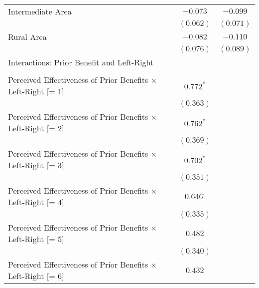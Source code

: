 \begin{center}
\begin{tiny}
\begin{longtable}{l@{} c@{} c@{}}
\quad Intermediate Area                                                    & $-0.073$         & $-0.099$         \\
                                                                           & $(0.062)$        & $(0.071)$        \\
\quad Rural Area                                                           & $-0.082$         & $-0.110$         \\
                                                                           & $(0.076)$        & $(0.089)$        \\
Interactions: Prior Benefit and Left-Right                                 &                  &                  \\
                                                                           &                  &                  \\
\quad Perceived Effectiveness of Prior Benefits $\times$ Left-Right [= 1]  & $0.772^{*}$      &                  \\
                                                                           & $(0.363)$        &                  \\
\quad Perceived Effectiveness of Prior Benefits $\times$ Left-Right [= 2]  & $0.762^{*}$      &                  \\
                                                                           & $(0.369)$        &                  \\
\quad Perceived Effectiveness of Prior Benefits $\times$ Left-Right [= 3]  & $0.702^{*}$      &                  \\
                                                                           & $(0.351)$        &                  \\
\quad Perceived Effectiveness of Prior Benefits $\times$ Left-Right [= 4]  & $0.646^{\cdot}$  &                  \\
                                                                           & $(0.335)$        &                  \\
\quad Perceived Effectiveness of Prior Benefits $\times$ Left-Right [= 5]  & $0.482$          &                  \\
                                                                           & $(0.340)$        &                  \\
\quad Perceived Effectiveness of Prior Benefits $\times$ Left-Right [= 6]  & $0.432$          &                  \\

\end{longtable}
\end{tiny}
\end{center}

